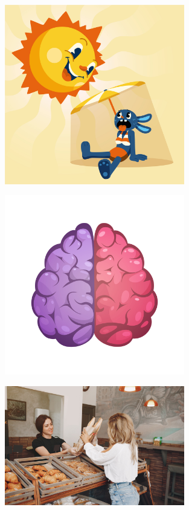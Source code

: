 \begin{figure}
\includegraphics[width=0.7\textwidth]{./imgSAEB_6_POR/freepik/PORT_6_IMG-18.jpeg}
\end{figure}

\begin{figure}
\includegraphics[width=0.7\textwidth]{./imgSAEB_6_POR/freepik/PORT_6_IMG-19.jpeg}
\end{figure}

\begin{figure}
\includegraphics[width=0.7\textwidth]{./imgSAEB_6_POR/freepik/PORT_6_IMG-20.jpeg}
\end{figure}

